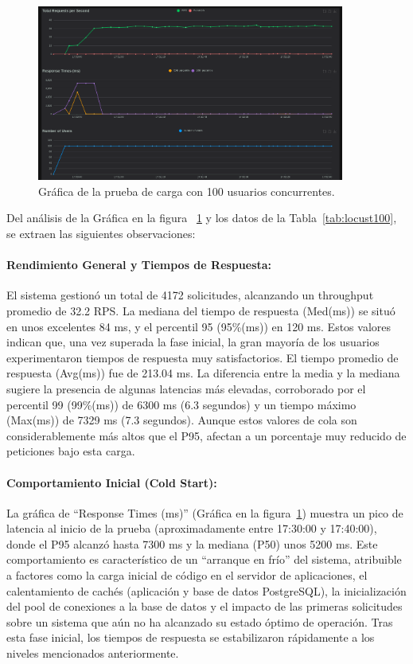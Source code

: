 \begin{figure}[H]
\centering
\includegraphics[width=0.9\textwidth]{figures/08_100_1.png}
\caption{Gráfica de la prueba de carga con 100 usuarios concurrentes.}
\label{fig:locust100}
\end{figure}

Del análisis de la Gráfica en la figura ~\ref{fig:locust100} y los datos de la Tabla~\ref{tab:locust100}, se extraen las siguientes observaciones:

\paragraph{Rendimiento General y Tiempos de Respuesta:}
El sistema gestionó un total de 4172 solicitudes, alcanzando un throughput promedio de 32.2 RPS. La mediana del tiempo de respuesta (Med(ms)) se situó en unos excelentes 84 ms, y el percentil 95 (95\%(ms)) en 120 ms. Estos valores indican que, una vez superada la fase inicial, la gran mayoría de los usuarios experimentaron tiempos de respuesta muy satisfactorios.
El tiempo promedio de respuesta (Avg(ms)) fue de 213.04 ms. La diferencia entre la media y la mediana sugiere la presencia de algunas latencias más elevadas, corroborado por el percentil 99 (99\%(ms)) de 6300 ms (6.3 segundos) y un tiempo máximo (Max(ms)) de 7329 ms (7.3 segundos). Aunque estos valores de cola son considerablemente más altos que el P95, afectan a un porcentaje muy reducido de peticiones bajo esta carga.

\paragraph{Comportamiento Inicial (Cold Start):}
La gráfica de ``Response Times (ms)'' (Gráfica en la figura~\ref{fig:locust100}) muestra un pico de latencia al inicio de la prueba (aproximadamente entre 17:30:00 y 17:40:00), donde el P95 alcanzó hasta 7300 ms y la mediana (P50) unos 5200 ms. Este comportamiento es característico de un ``arranque en frío'' del sistema, atribuible a factores como la carga inicial de código en el servidor de aplicaciones, el calentamiento de cachés (aplicación y base de datos PostgreSQL), la inicialización del pool de conexiones a la base de datos y el impacto de las primeras solicitudes sobre un sistema que aún no ha alcanzado su estado óptimo de operación. Tras esta fase inicial, los tiempos de respuesta se estabilizaron rápidamente a los niveles mencionados anteriormente.

